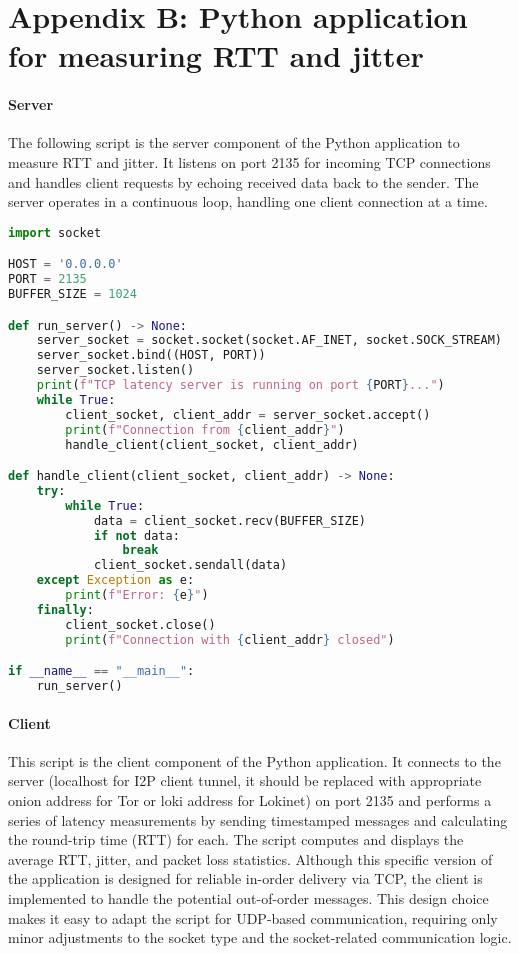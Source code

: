 \chapter*{Appendix B: Python application for measuring RTT and jitter}
\label{chap:AppendixB}

\subsubsection{Server}

The following script is the server component of the Python application to measure RTT and jitter. It listens on port 2135 for incoming TCP connections and handles client requests by echoing received data back to the sender. The server operates in a continuous loop, handling one client connection at a time.

\footnotesize
\begin{lstlisting}[language=python, breaklines=true, breakatwhitespace=true, showstringspaces=false]
import socket

HOST = '0.0.0.0'
PORT = 2135
BUFFER_SIZE = 1024

def run_server() -> None:
    server_socket = socket.socket(socket.AF_INET, socket.SOCK_STREAM)
    server_socket.bind((HOST, PORT))
    server_socket.listen()
    print(f"TCP latency server is running on port {PORT}...")
    while True:
        client_socket, client_addr = server_socket.accept()
        print(f"Connection from {client_addr}")
        handle_client(client_socket, client_addr)

def handle_client(client_socket, client_addr) -> None:
    try:
        while True:
            data = client_socket.recv(BUFFER_SIZE)
            if not data:
                break
            client_socket.sendall(data)
    except Exception as e:
        print(f"Error: {e}")
    finally:
        client_socket.close()
        print(f"Connection with {client_addr} closed")

if __name__ == "__main__":
    run_server()
\end{lstlisting}
\normalsize

\subsubsection{Client}

This script is the client component of the Python application. It connects to the server (localhost for I2P client tunnel, it should be replaced with appropriate onion address for Tor or loki address for Lokinet) on port 2135 and performs a series of latency measurements by sending timestamped messages and calculating the round-trip time (RTT) for each. The script computes and displays the average RTT, jitter, and packet loss statistics. Although this specific version of the application is designed for reliable in-order delivery via TCP, the client is implemented to handle the potential out-of-order messages. This design choice makes it easy to adapt the script for UDP-based communication, requiring only minor adjustments to the socket type and the socket-related communication logic.


